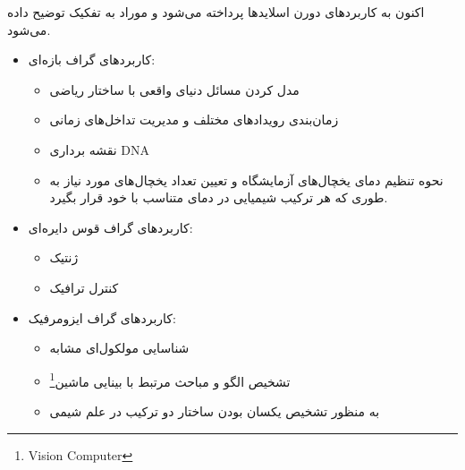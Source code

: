 \documentclass[a4paper,10pt]{article}
\begin{document}
    اکنون به کاربردهای دورن اسلایدها پرداخته می‌شود و موراد به تفکیک توضیح داده می‌شود.

    \begin{itemize}
        
        \item کاربردهای گراف بازه‌ای:
        
        \begin{itemize}

            \item مدل کردن مسائل دنیای واقعی با ساختار ریاضی
            
            \item زمان‌بندی رویدادهای مختلف و مدیریت تداخل‌های زمانی
            
            \item نقشه برداری DNA

            \item نحوه تنظیم دمای یخچال‌های آزمایشگاه و تعیین تعداد یخچال‌های مورد نیاز به طوری که هر ترکیب شیمیایی در دمای متناسب با خود قرار بگیرد.

        \end{itemize}

        \item کاربردهای گراف قوس دایره‌ای:
        
        \begin{itemize}
            
            \item ژنتیک
            
            \item کنترل ترافیک

        \end{itemize}

        \item کاربردهای گراف ایزومرفیک:
        
        \begin{itemize}
            
            \item شناسایی مولکول‌ای مشابه

            \item تشخیص الگو و مباحث مرتبط با بینایی ماشین\footnote{\hspace{2pt}Vision Computer}
            
            \item به منظور تشخیص یکسان بودن ساختار دو ترکیب در علم شیمی

        \end{itemize}


\end{itemize}
\end{document}
